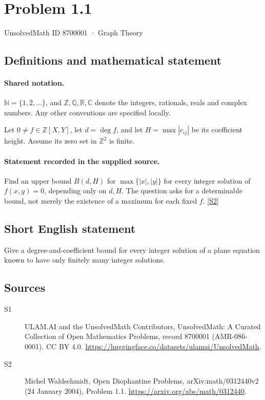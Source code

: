 \documentclass[11pt]{article}
\newcommand{\sref}[2]{\hyperlink{source:#1:#2}{[S#2]}}
\begin{document}
\setcounter{section}{8700000}
\section{Problem 1.1}\label{8700001}
{\small\sffamily UnsolvedMath ID 8700001 · Graph Theory}
\subsection{Definitions and mathematical statement}

\paragraph{Shared notation.}$\mathbb N=\{1,2,\ldots\}$, and $\mathbb Z,\mathbb Q,\mathbb R,\mathbb C$ denote the integers, rationals, reals and complex numbers. Any other conventions are specified locally.


Let $0\ne f\in\mathbb Z[X,Y]$, let $d=\deg f$, and let $H=\max|c_{ij}|$ be its coefficient height. Assume its zero set in $\mathbb Z^2$ is finite.
\paragraph{Statement recorded in the supplied source.}
Find an upper bound $B(d,H)$ for $\max\{|x|,|y|\}$ for every integer solution of $f(x,y)=0$, depending only on $d,H$. The question asks for a determinable bound, not merely the existence of a maximum for each fixed $f$. \sref{8700001}{2}
\subsection{Short English statement}
Give a degree-and-coefficient bound for every integer solution of a plane equation known to have only finitely many integer solutions.
\subsection{Sources}
\begin{description}
\item[\hypertarget{source:8700001:1}{S1}] ULAM.AI and the UnsolvedMath Contributors, UnsolvedMath: A Curated Collection of Open Mathematics Problems, record 8700001 (AMR-086-0001). CC BY 4.0. \url{https://huggingface.co/datasets/ulamai/UnsolvedMath}.
\item[\hypertarget{source:8700001:2}{S2}] Michel Waldschmidt, Open Diophantine Problems, arXiv:math/0312440v2 (24 January 2004), Problem 1.1. \url{https://arxiv.org/abs/math/0312440}.
\end{description}
\label{end:8700001}
\end{document}

